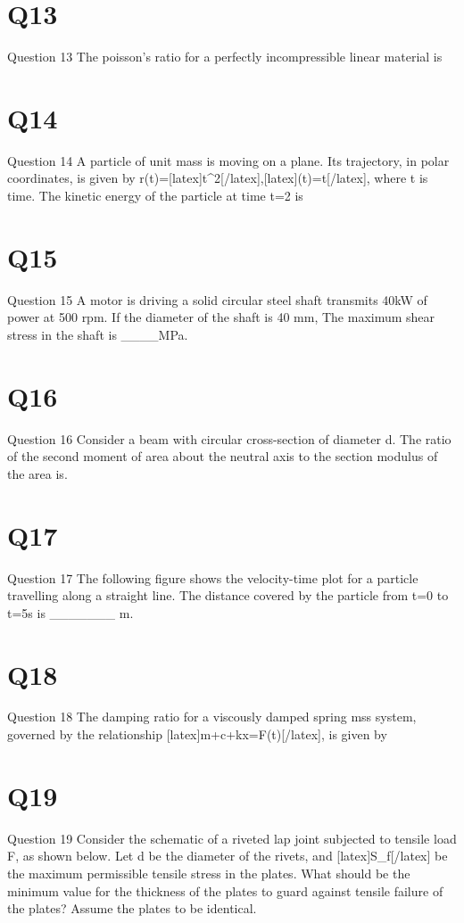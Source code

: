 \section*{Q13}
Question 13 The poisson's ratio for a perfectly incompressible linear material is

\section*{Q14}
Question 14 A particle of unit mass is moving on a plane. Its trajectory, in polar coordinates, is given by r(t)=[latex]t^{2}[/latex],[latex]\theta (t)=t[/latex], where t is time. The kinetic energy of the particle at time t=2 is

\section*{Q15}
Question 15 A motor is driving a solid circular steel shaft transmits 40kW of power at 500 rpm. If the diameter of the shaft is 40 mm, The maximum shear stress in the shaft is \_\_\_\_MPa.

\section*{Q16}
Question 16 Consider a beam with circular cross-section of diameter d. The ratio of the second moment of area about the neutral axis to the section modulus of the area is.

\section*{Q17}
Question 17 The following figure shows the velocity-time plot for a particle travelling along a straight line. The distance covered by the particle from t=0 to t=5s is \_\_\_\_\_\_\_ m.

\section*{Q18}
Question 18 The damping ratio for a viscously damped spring mss system, governed by the relationship [latex]m+c+kx=F(t)[/latex], is given by

\section*{Q19}
Question 19 Consider the schematic of a riveted lap joint subjected to tensile load F, as shown below. Let d be the diameter of the rivets, and [latex]S\_{f}[/latex]  be the maximum permissible tensile stress in the plates. What should be the minimum value for the thickness of the plates to guard against tensile failure of the plates? Assume the plates to be identical.

